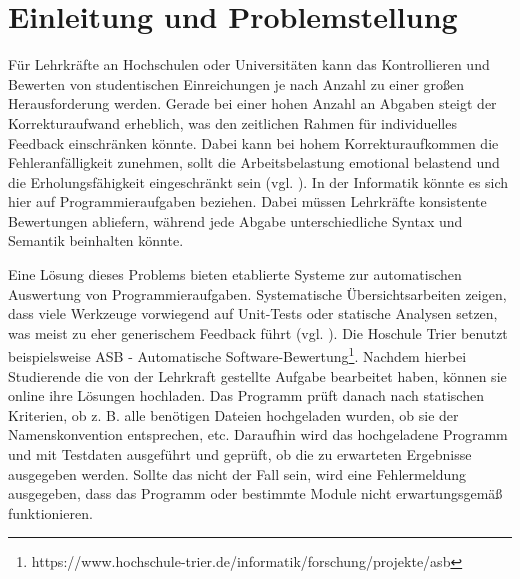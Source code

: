 \chapter{Einleitung und Problemstellung}




Für Lehrkräfte an Hochschulen oder Universitäten kann das Kontrollieren und Bewerten von studentischen Einreichungen je nach Anzahl zu einer großen Herausforderung werden. Gerade bei einer hohen Anzahl an Abgaben steigt der Korrekturaufwand erheblich, was den zeitlichen Rahmen für individuelles Feedback einschränken könnte. Dabei kann bei hohem Korrekturaufkommen die Fehleranfälligkeit zunehmen, sollt die Arbeitsbelastung emotional belastend und die Erholungsfähigkeit eingeschränkt sein (vgl. \cite{Ternikov.2024}). In der Informatik könnte es sich hier auf Programmieraufgaben beziehen. Dabei müssen Lehrkräfte konsistente Bewertungen abliefern, während jede Abgabe unterschiedliche Syntax und Semantik beinhalten könnte.

Eine Lösung dieses Problems bieten etablierte Systeme zur automatischen Auswertung von Programmieraufgaben. Systematische Übersichtsarbeiten zeigen, dass viele Werkzeuge vorwiegend auf Unit-Tests oder statische Analysen setzen, was meist zu eher generischem Feedback führt (vgl. \cite{Messer.2023}). Die Hoschule Trier benutzt beispielsweise ASB - Automatische Software-Bewertung\footnote{https://www.hochschule-trier.de/informatik/forschung/projekte/asb}. Nachdem hierbei Studierende die von der Lehrkraft gestellte Aufgabe bearbeitet haben, können sie online ihre Lösungen hochladen. Das Programm prüft danach nach statischen Kriterien, ob z. B. alle benötigen Dateien hochgeladen wurden, ob sie der Namenskonvention entsprechen, etc. Daraufhin wird das hochgeladene Programm und mit Testdaten ausgeführt und geprüft, ob die zu erwarteten Ergebnisse ausgegeben werden. Sollte das nicht der Fall sein, wird eine Fehlermeldung ausgegeben, dass das Programm oder bestimmte Module nicht erwartungsgemäß funktionieren. 

